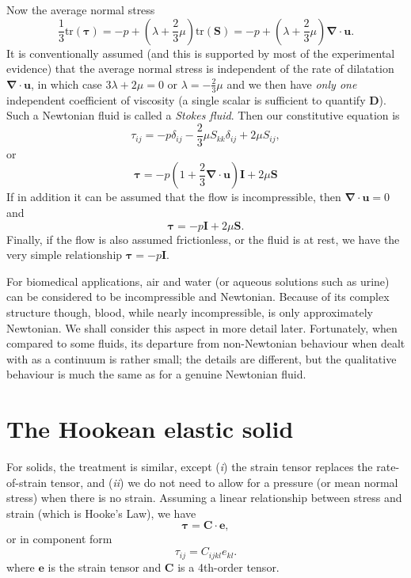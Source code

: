 \documentclass[twoside,11pt]		{report}
\begin{document}
Now the average normal stress
\begin{equation}
\textstyle{\frac{1}{3}}\mathrm{tr}(\bm{\tau}) =
 -p + \left(\lambda + \textstyle{\frac{2}{3}}\mu\right)\mathrm{tr}(\bm{S})=
 -p + \left(\lambda + \textstyle{\frac{2}{3}}\mu\right)\bm{\nabla\cdot u}.
\end{equation}
It is conventionally assumed (and this is supported by most of the
experimental evidence) that the average normal stress is independent
of the rate of dilatation $\bm{\nabla\cdot u}$, in which case
$3\lambda + 2\mu=0$ or $\lambda=-\frac{2}{3}\mu$ and we then have
\emph{only one} independent coefficient of viscosity (\ie a single
scalar is sufficient to quantify $\bm{D}$). Such a Newtonian fluid is
called a \emph{Stokes fluid}. Then our constitutive equation is
\begin{equation}
\tau_{ij} = -p \delta_{ij} -
\textstyle{\frac{2}{3}}\mu S_{kk}\delta_{ij} + 2\mu S_{ij},
\end{equation}
or
\begin{equation}
\bm{\tau} = -p (1 +\textstyle{\frac{2}{3}}\bm{\nabla\cdot u})\bm{I} +
 2\mu\bm{S} 
\end{equation}
If in addition it can be assumed that the flow is incompressible, then
$\bm{\nabla\cdot u}=0$ and
\begin{equation}
\bm{\tau} = -p\bm{I} + 2\mu\bm{S}.
\label{eq.newtinc}
\end{equation}
Finally, if the flow is also assumed frictionless, or the fluid is at
rest, we have the very simple relationship $\bm{\tau} = -p\bm{I}$.

For biomedical applications, air and water (or aqueous solutions such
as urine) can be considered to be incompressible and
Newtonian. Because of its complex structure though, blood, while
nearly incompressible, is only approximately Newtonian. We shall
consider this aspect in more detail later. Fortunately, when compared
to some fluids, its departure from non-Newtonian behaviour when dealt
with as a continuum is rather small; the details are different, but
the qualitative behaviour is much the same as for a genuine Newtonian
fluid.

\section{The Hookean elastic solid}

For solids, the treatment is similar, except (\textit{i}) the strain
tensor replaces the rate-of-strain tensor, and (\textit{ii}) we do
not need to allow for a pressure (or mean normal stress) when there is
no strain. Assuming a linear relationship between stress and strain
(which is Hooke's Law), we have
\begin{equation}
\bm{\tau}=\bm{C\cdot e},
\end{equation}
or in component form
\begin{equation}
\tau_{ij} = C_{ijkl}e_{kl}.
\end{equation}
where $\bm{e}$ is the strain tensor and $\bm{C}$ is a 4th-order tensor.
\end{document}
